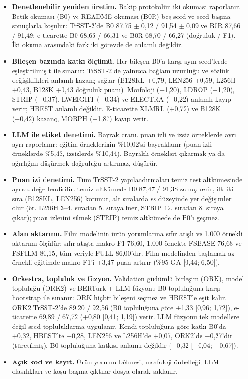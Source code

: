 \documentclass[11pt]{article}
\begin{document}
\begin{itemize}
\item \textbf{Denetlenebilir yeniden üretim.} Rakip protokolün iki okuması raporlanır. Betik okuması (B0) ve README okuması (B0R) beş seed ve seed başına sonuçlarla koşulur: TrSST-2'de B0 87,75 $\pm$ 0,12 / 91,54 $\pm$ 0,09 ve B0R 87,66 / 91,49; e-ticarette B0 68,65 / 66,31 ve B0R 68,70 / 66,27 (doğruluk / F1). İki okuma arasındaki fark iki görevde de anlamlı değildir.
\item \textbf{Bileşen bazında katkı ölçümü.} Her bileşen B0'a karşı aynı seed'lerde eşleştirilmiş t ile sınanır: TrSST-2'de yalnızca bağlam uzunluğu ve sözlük değişiklikleri anlamlı kazanç sağlar (B128KL +0,79, LEN256 +0,59, L256H +0,43, B128K +0,43 doğruluk puanı). Morfoloji ($-$1,20), LDROP ($-$1,20), STRIP ($-$0,37), LWEIGHT ($-$0,34) ve ELECTRA ($-$0,22) anlamlı kayıp verir; HBEST anlamlı değildir. E-ticarette XLMRL (+0,72) ve B128K (+0,42) kazanç, MORPH ($-$1,87) kayıp verir.
\item \textbf{LLM ile etiket denetimi.} Bayrak oranı, puan izli ve izsiz örneklerde ayrı ayrı raporlanır: eğitim örneklerinin \%10,02'si bayraklanır (puan izli örneklerde \%5,43, izsizlerde \%10,44). Bayraklı örnekleri çıkarmak ya da ağırlığını düşürmek doğruluğu artırmaz, düşürür.
\item \textbf{Puan izi denetimi.} Tüm TrSST-2 yapılandırmaları temiz test altkümesinde ayrıca değerlendirilir: temiz altkümede B0 87,47 / 91,38 sonuç verir; ilk iki sıra (B128KL, LEN256) korunur, alt sıralarda ss düzeyinde yer değişimleri olur (ör. L256H 3–4. sıradan 5. sıraya iner, STRIP 12. sıradan 8. sıraya çıkar); puan izlerini silmek (STRIP) temiz altkümede de B0'ı geçmez.
\item \textbf{Alan aktarımı.} Film modelinin ürün yorumlarına sıfır atışlı ve 1.000 örnekli aktarımı ölçülür: sıfır atışta makro F1 76,60, 1.000 örnekte FSBASE 76,68 ve FSFILM 80,15, tüm veriyle FULL 86,00'dır. Film modelinden başlamak az örnekli eğitimde makro F1'i +3,47 puan artırır (\%95 GA [0,44; 6,50]).
\item \textbf{Orkestra, topluluk ve füzyon.} Validation güdümlü birleşim (ORK), model topluluğu (ORK2) ve BERTurk + LLM füzyonu B0 topluluğuna karşı bootstrap ile sınanır: ORK hiçbir bileşeni seçmez ve HBEST'e eşit kalır. ORK2 TrSST-2'de 89,20 / 92,56 (B0 topluluğuna göre +1,33 [0,96; 1,72]), e-ticarette 69,89 / 67,72 (+0,80 [0,41; 1,19]) verir. LLM füzyonu tek modellere değil seed topluluklarına uygulanır. Kendi topluluğuna göre katkı B0'da +0,32, HBEST'te +0,28, LEN256 ve L256H'de +0,07, ORK2'de $-$0,27'dir (türetilmiş). B0 topluluğuna katkısı anlamlı değildir (+0,32 [$-$0,04; +0,67]).
\item \textbf{Açık kod ve kayıt.} Ürün yorumu bölmesi, morfoloji önbelleği, LLM olasılıkları ve koşu başına çıktılar dosya olarak saklanır.
\end{itemize}
\end{document}
